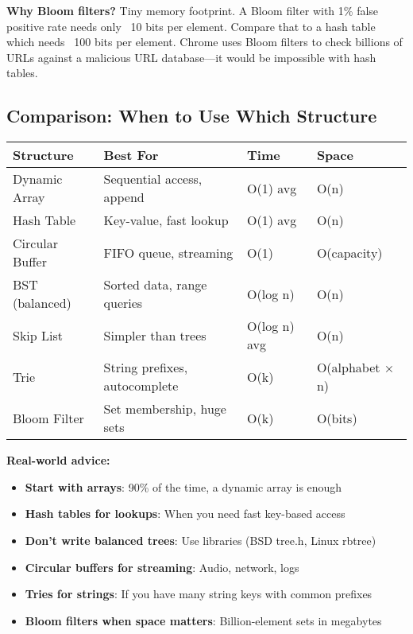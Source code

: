 \begin{notebox}
\textbf{Why Bloom filters?} Tiny memory footprint. A Bloom filter with 1\% false positive rate needs only ~10 bits per element. Compare that to a hash table which needs ~100 bits per element. Chrome uses Bloom filters to check billions of URLs against a malicious URL database—it would be impossible with hash tables.
\end{notebox}

\subsection{Comparison: When to Use Which Structure}

\begin{center}
\begin{tabular}{|l|l|l|l|}
\hline
\textbf{Structure} & \textbf{Best For} & \textbf{Time} & \textbf{Space} \\
\hline
Dynamic Array & Sequential access, append & O(1) avg & O(n) \\
Hash Table & Key-value, fast lookup & O(1) avg & O(n) \\
Circular Buffer & FIFO queue, streaming & O(1) & O(capacity) \\
BST (balanced) & Sorted data, range queries & O(log n) & O(n) \\
Skip List & Simpler than trees & O(log n) avg & O(n) \\
Trie & String prefixes, autocomplete & O(k) & O(alphabet × n) \\
Bloom Filter & Set membership, huge sets & O(k) & O(bits) \\
\hline
\end{tabular}
\end{center}

\begin{tipbox}
\textbf{Real-world advice:}
\begin{itemize}
    \item \textbf{Start with arrays}: 90\% of the time, a dynamic array is enough
    \item \textbf{Hash tables for lookups}: When you need fast key-based access
    \item \textbf{Don't write balanced trees}: Use libraries (BSD tree.h, Linux rbtree)
    \item \textbf{Circular buffers for streaming}: Audio, network, logs
    \item \textbf{Tries for strings}: If you have many string keys with common prefixes
    \item \textbf{Bloom filters when space matters}: Billion-element sets in megabytes
\end{itemize}
\end{tipbox}

